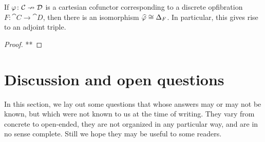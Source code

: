 \documentclass[DynamicalBook]{subfiles}
\begin{document}
\begin{corollary}\label{cor.cartesian_cof_extra_adjoint}
If $\varphi\colon\mathcal{C}\nrightarrow\mathcal{D}$ is a cartesian cofunctor corresponding to a discrete opfibration $F\colon\cat{C}\to\cat{D}$, then there is an isomorphism $\widehat{\varphi}\cong\Delta_F$. In particular, this gives rise to an adjoint triple.
\end{corollary}
\begin{proof}
**
\end{proof}


\section{Discussion and open questions}\label{sec.discussion_open_qs}

In this section, we lay out some questions that whose answers may or may not be known, but which were not known to us at the time of writing. They vary from concrete to open-ended, they are not organized in any particular way, and are in no sense complete. Still we hope they may be useful to some readers.
\end{document}
